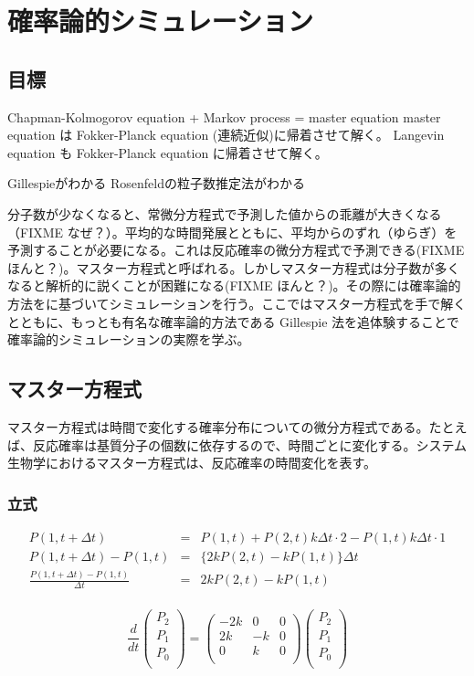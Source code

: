 \chapter{確率論的シミュレーション}
\section{目標}
Chapman-Kolmogorov equation + Markov process = master equation
master equation は Fokker-Planck equation (連続近似)に帰着させて解く。
Langevin equation も Fokker-Planck equation に帰着させて解く。

Gillespieがわかる
Rosenfeldの粒子数推定法がわかる

分子数が少なくなると、常微分方程式で予測した値からの乖離が大きくなる（FIXME なぜ？）。平均的な時間発展とともに、平均からのずれ（ゆらぎ）を予測することが必要になる。これは反応確率の微分方程式で予測できる(FIXME ほんと？)。マスター方程式と呼ばれる。しかしマスター方程式は分子数が多くなると解析的に説くことが困難になる(FIXME ほんと？)。その際には確率論的方法をに基づいてシミュレーションを行う。ここではマスター方程式を手で解くとともに、もっとも有名な確率論的方法である Gillespie 法を追体験することで確率論的シミュレーションの実際を学ぶ。


\section{マスター方程式}
マスター方程式は時間で変化する確率分布についての微分方程式である。たとえば、反応確率は基質分子の個数に依存するので、時間ごとに変化する。システム生物学におけるマスター方程式は、反応確率の時間変化を表す。

\subsection{立式}
\begin{eqnarray*}
P(1, t+\Delta t) & = & P(1,t) + P(2,t)k\Delta t \cdot 2 - P(1,t)k\Delta t \cdot 1\\
P(1, t+\Delta t) - P(1,t) & = & \{ 2k P(2,t) - k P(1,t)\}\Delta t\\
\frac{P(1, t+\Delta t) - P(1,t)}{\Delta t} & = & 2k P(2,t) - k P(1,t)\\
\end{eqnarray*}

\[
\frac{d}{dt}
\left(
\begin{array}{r}
P_2\\
P_1\\
P_0\\
\end{array}
\right)
=
\left(
\begin{array}{rrr}
-2k & 0 & 0\\
2k & -k & 0\\
0 & k & 0\\
\end{array}
\right)
\left(
\begin{array}{r}
P_2\\
P_1\\
P_0\\
\end{array}
\right)
\]


